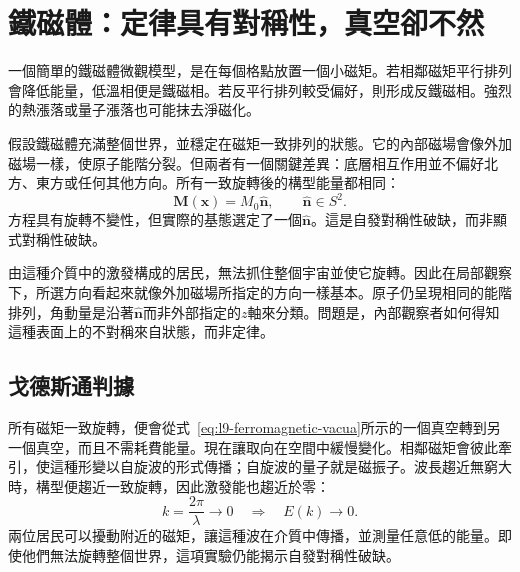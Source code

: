 \begin{classroomqa}
\end{classroomqa}

\begin{center}
\end{center}

\section{鐵磁體：定律具有對稱性，真空卻不然}

一個簡單的鐵磁體微觀模型，是在每個格點放置一個小磁矩。若相鄰磁矩平行排列會降低能量，低溫相便是鐵磁相。若反平行排列較受偏好，則形成反鐵磁相。強烈的熱漲落或量子漲落也可能抹去淨磁化。

假設鐵磁體充滿整個世界，並穩定在磁矩一致排列的狀態。它的內部磁場會像外加磁場一樣，使原子能階分裂。但兩者有一個關鍵差異：底層相互作用並不偏好北方、東方或任何其他方向。所有一致旋轉後的構型能量都相同：
\begin{equation}
\mathbf M(\mathbf x)=M_0\hat{\mathbf n},
\qquad
\hat{\mathbf n}\in S^2.
\label{eq:l9-ferromagnetic-vacua}
\end{equation}
方程具有旋轉不變性，但實際的基態選定了一個\(\hat{\mathbf n}\)。這是自發對稱性破缺，而非顯式對稱性破缺。

由這種介質中的激發構成的居民，無法抓住整個宇宙並使它旋轉。因此在局部觀察下，所選方向看起來就像外加磁場所指定的方向一樣基本。原子仍呈現相同的能階排列，角動量是沿著\(\hat{\mathbf n}\)而非外部指定的\(z\)軸來分類。問題是，內部觀察者如何得知這種表面上的不對稱來自狀態，而非定律。

\subsection{戈德斯通判據}

所有磁矩一致旋轉，便會從式~\eqref{eq:l9-ferromagnetic-vacua}所示的一個真空轉到另一個真空，而且不需耗費能量。現在讓取向在空間中緩慢變化。相鄰磁矩會彼此牽引，使這種形變以自旋波的形式傳播；自旋波的量子就是磁振子。波長趨近無窮大時，構型便趨近一致旋轉，因此激發能也趨近於零：
\begin{equation}
k=\frac{2\pi}{\lambda}\longrightarrow0
\quad\Longrightarrow\quad
E(k)\longrightarrow0.
\label{eq:l9-gapless-magnon}
\end{equation}
兩位居民可以擾動附近的磁矩，讓這種波在介質中傳播，並測量任意低的能量。即使他們無法旋轉整個世界，這項實驗仍能揭示自發對稱性破缺。

